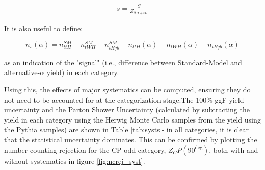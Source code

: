 \begin{align}
s = \frac{S}{Z_{ttH+tH}}
\label{eq:statunc}
\end{align}

It is also useful to define:

\begin{equation}
n_{s}(\alpha) = n_{ttH}^{SM} + n_{tWH}^{SM} + n_{tHjb}^{SM} - n_{ttH}(\alpha) - n_{tWH}(\alpha) - n_{tHjb}(\alpha)
\end{equation}

as an indication of the "signal" (i.e., difference between Standard-Model and alternative-$\alpha$ yield) in each category. 

\begin{figure}
\end{figure}

Using this, the effects of major systematics can be computed, ensuring they do not need to be accounted for at the categorization stage.The 100\% ggF yield uncertainty and the Parton Shower Uncertainty (calculated by subtracting the yield in each category using the Herwig Monte Carlo samples from the yield using the Pythia samples) are shown in Table \ref{tab:systs}- in all categories, it is clear that the statistical uncertainty dominates. This can be confirmed by plotting the number-counting rejection for the CP-odd category, $Z_CP(90^{\deg})$, both with and without systematics in figure \ref{fig:ncrej_syst}. 


